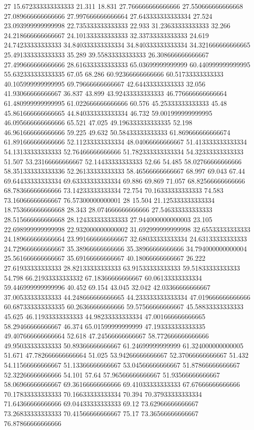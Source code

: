 27 15.672333333333333 21.311 18.831 27.766666666666666 27.550666666666668 27.089666666666666 27.997666666666664 27.643333333333334 27.524 23.093999999999998 22.735333333333333 22.933 31.23633333333333 32.266 24.218666666666667 24.101333333333333 32.33733333333333 24.619 24.74233333333333 34.840333333333334 34.840333333333334 34.321666666666665 25.491333333333333 35.289 39.55833333333333 26.308666666666667 27.499666666666666 28.616333333333333 65.03699999999999 60.440999999999995 55.632333333333335 67.05 68.286 60.92366666666666 60.51733333333333 40.105999999999995 69.79666666666667 42.64433333333333 32.056 41.93066666666667 36.837 43.899 43.92433333333333 46.776666666666664 61.480999999999995 61.022666666666666 60.576 45.25333333333333 45.48 45.861666666666665 44.840333333333334 46.732 59.001999999999995 46.095666666666666 65.521 47.025 49.196333333333335 52.198 46.961666666666666 59.225 49.632 50.58433333333333 61.869666666666674 61.891666666666666 52.11233333333334 48.04066666666667 51.413333333333334 54.13133333333333 52.76466666666666 51.782333333333334 54.32333333333333 51.507 53.23166666666667 52.14433333333333 52.66 54.485 58.02766666666666 58.351333333333336 52.26133333333333 58.46566666666667 68.997 69.043 67.44 69.64433333333334 69.63333333333334 69.886 69.869 71.057 68.82566666666666 68.78366666666666 73.14233333333334 72.754 70.16333333333333 74.583 73.16066666666667 76.57300000000001
28 15.504 21.125333333333334 18.753666666666668 28.343 28.074666666666666 27.546333333333333 28.515666666666668 28.124333333333333 27.944000000000003 23.105 22.698999999999998 22.932000000000002 31.692999999999998 32.65533333333333 24.189666666666664 23.991666666666667 32.68033333333334 24.63133333333333 24.729666666666667 35.38966666666666 35.38966666666666 34.794000000000004 25.561666666666667 35.69166666666667 40.18066666666667 26.222 27.61933333333333 28.82133333333333 63.91533333333333 59.51833333333333 54.798 66.21933333333332 67.18366666666667 60.06133333333334 59.446999999999996 40.452 69.154 43.045 32.042 42.03366666666667 37.00533333333333 44.248666666666665 44.233333333333334 47.019666666666666 60.687333333333335 60.26366666666666 59.57566666666667 45.58833333333333 45.625 46.11933333333333 44.98233333333334 47.001666666666665 58.29466666666667 46.374 65.01599999999999 47.193333333333335 49.407666666666664 52.618 47.24566666666667 58.772666666666666 49.95033333333333 50.89366666666667 61.24699999999999 61.324000000000005 51.671 47.782666666666664 51.025 53.94266666666667 52.37066666666667 51.432 54.11566666666667 51.13366666666667 53.04566666666667 51.87866666666667 52.32266666666666 54.101 57.64 57.96566666666667 51.93566666666667 58.06966666666667 69.36166666666666 69.41033333333333 67.67666666666666 70.17833333333333 70.16633333333334 70.394 70.37933333333334 71.64366666666666 69.04433333333333 69.12 73.62966666666667 73.26833333333333 70.41566666666667 75.17 73.36566666666667 76.87866666666666
